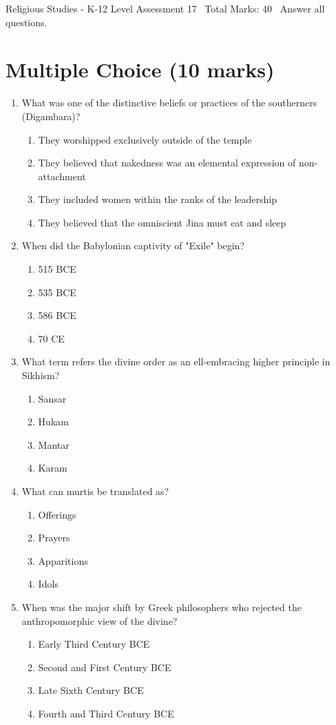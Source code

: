 \documentclass[12pt]{article}
\begin{document}
\begin{center}
Religious Studies - K-12 Level Assessment 17 \
Total Marks: 40 \
Answer all questions.
\end{center}

\section*{Multiple Choice (10 marks)}
\begin{enumerate}[label=\arabic*.]
\item What was one of the distinctive beliefs or practices of the southerners (Digambara)?
\begin{enumerate}[label=(\alph*)]
    \item They worshipped exclusively outside of the temple
    \item They believed that nakedness was an elemental expression of non-attachment
    \item They included women within the ranks of the leadership
    \item They believed that the omniscient Jina must eat and sleep
\end{enumerate}
\item When did the Babylonian captivity of "Exile" begin?
\begin{enumerate}[label=(\alph*)]
    \item 515 BCE
    \item 535 BCE
    \item 586 BCE
    \item 70 CE
\end{enumerate}
\item What term refers the divine order as an ell-embracing higher principle in Sikhism?
\begin{enumerate}[label=(\alph*)]
    \item Sansar
    \item Hukam
    \item Mantar
    \item Karam
\end{enumerate}
\item What can murtis be translated as?
\begin{enumerate}[label=(\alph*)]
    \item Offerings
    \item Prayers
    \item Apparitions
    \item Idols
\end{enumerate}
\item When was the major shift by Greek philosophers who rejected the anthropomorphic view of the divine?
\begin{enumerate}[label=(\alph*)]
    \item Early Third Century BCE
    \item Second and First Century BCE
    \item Late Sixth Century BCE
    \item Fourth and Third Century BCE
\end{enumerate}
\end{enumerate}
\end{document}

